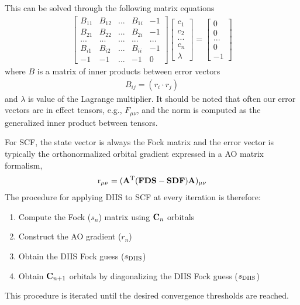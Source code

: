 \documentclass[aip,jcp,preprint,superscriptaddress,floatfix]{revtex4-1}
\begin{document}
This can be solved through the following matrix equations
\begin{eqnarray}
\begin{bmatrix}
 B_{11}&   B_{12}&  ...& B_{1i} & -1\\ 
  B_{21}&   B_{22}&  ...& B_{2i} & -1\\ 
 ...&  ...&  ...&  ...& ...\\ 
  B_{i1}&  B_{i2}&  ...&   B_{ii}& -1\\ 
 -1& -1 & ... &  -1& 0
\end{bmatrix}
\begin{bmatrix}
c_1\\
c_2\\
...\\
c_n\\
\lambda
\end{bmatrix}
=
\begin{bmatrix}
0\\
0\\
...\\
0\\
-1
\end{bmatrix}
\end{eqnarray}
where $B$ is a matrix of inner products between error vectors
\begin{eqnarray}
B_{ij} = (r_i \cdot r_j)
\end{eqnarray}
and $\lambda$ is value of the Lagrange multiplier.
It should be noted that often our error vectors are in effect tensors, e.g., $F_{\mu\nu}$, and the norm is computed as the generalized inner product between tensors.

For SCF, the state vector is always the Fock matrix and the error vector is typically the orthonormalized orbital gradient expressed in a AO matrix formalism,
\begin{eqnarray}
{\rm r_{\mu\nu} = ({\bf A}^T({\rm\bf FDS} - {\rm\bf SDF}}){\bf A})_{\mu\nu}
\end{eqnarray}
The procedure for applying DIIS to SCF at every iteration is therefore:
\begin{enumerate}
\item Compute the Fock ($s_n$) matrix using ${\bf C}_{n}$ orbitals
\item Construct the AO gradient ($r_n$)
\item Obtain the DIIS Fock guess ($s_{\rm DIIS}$)
\item Obtain ${\bf C}_{n+1}$ orbitals by diagonalizing the DIIS Fock guess ($s_{\rm DIIS}$)
\end{enumerate}
This procedure is iterated until the desired convergence thresholds are reached.
\end{document}
